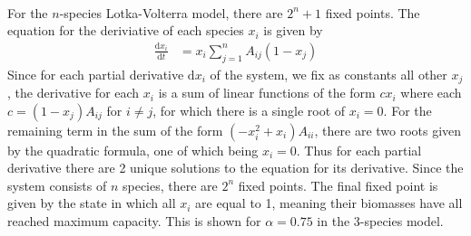 \documentclass[11pt, oneside]{article}   	%
\newcommand{\prob}[2]{
\indent \\
\noindent{\color{green!50!blue}\bf {\large#1.}}
{\normalfont #2}
}
\begin{document}
\prob{6}{For the $n$-species Lotka-Volterra model, there are $2^{n}+1$ fixed points. The equation for the deriviative of each species $x_{i}$ is given by
\begin{align*}
    \frac{\mathrm{d}x_{i}}{\mathrm{d}t} &= x_{i}\sum_{j=1}^{n}A_{ij}(1-x_{j})
\end{align*}
Since for each partial derivative $\mathrm{d}x_{i}$ of the system, we fix as constants all other $x_{j}$, the derivative for each $x_{i}$ is a sum of linear functions of the form $cx_{i}$ where each $c=(1-x_{j})A_{ij}$ for $i\neq j$, for which there is a single root of $x_{i}=0$. For the remaining term in the sum of the form $(-x_{i}^{2}+x_{i})A_{ii}$, there are two roots given by the quadratic formula, one of which being $x_{i}=0$. Thus for each partial derivative there are 2 unique solutions to the equation for its derivative. Since the system consists of $n$ species, there are $2^{n}$ fixed points. The final fixed point is given by the state in which all $x_{i}$ are equal to 1, meaning their biomasses have all reached maximum capacity. This is shown for $\alpha=0.75$ in the 3-species model.}
\end{document}
